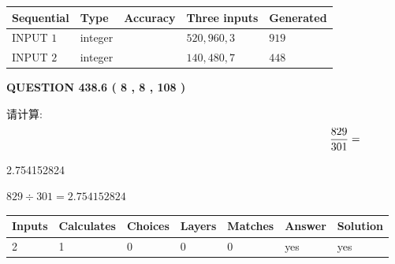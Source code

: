 \documentclass{ctexart}
\begin{document}
   
  
  
\noindent\begin{tabular}{|l|l|l|l|l|}
\hline
 Sequential & Type & Accuracy & Three inputs & Generated \\ 
\hline
 
 
  INPUT $  1 $ & integer &  & $
 520
 , 
 960
 , 
 3
 $ & $ 919 $ 
 \\  \hline  
 
 
  INPUT $  2 $ & integer &  & $
 140
 , 
 480
 , 
 7
 $ & $ 448 $ 
 \\  \hline  
 \end{tabular}
   
   
  
\vspace{0.2in}
  
{\textbf{\Large{QUESTION
438.6 
 ( 8 , 8 , 108 )
}}}
  
  
 
请计算:
\begin{equation}
\frac { %
829 }  {  %
301} = \nonumber
\end{equation}
 
 
 
\noindent{}
 
 

2.754152824
 
 
\noindent{}
 
 

 
 
 
\noindent{}
 
 

$ %
829 \div  %
301=   %
2.754152824$
 
 
\noindent{}
 
 

 
   
   
   
   
\noindent\begin{tabular}{|l|l|l|l|l|l|l|}
 \hline
Inputs & Calculates & Choices & Layers & Matches & Answer & Solution \\ \hline
 2  & 
 1  & 
 0
  & 
 0  & 
 0  & 
  yes & 
  yes 
  \\ \hline
 \end{tabular}
   
\end{document}
